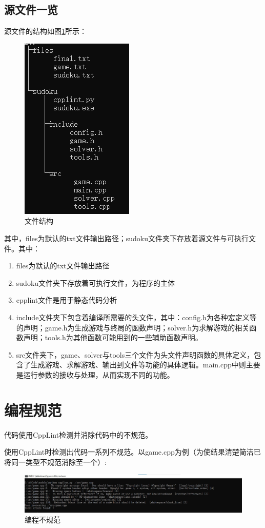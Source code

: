 \documentclass[a4paper]{article}
\begin{document}
\subsection{源文件一览}
源文件的结构如图\ref{fig:tree}所示：
\begin{figure}[!ht]
    \centering
    \includegraphics[scale=0.9]{images/tree.png}
    \caption{文件结构}
    \label{fig:tree}
\end{figure}
\par
其中，files为默认的txt文件输出路径；sudoku文件夹下存放着源文件与可执行文件。其中：
\begin{enumerate}
\item files为默认的txt文件输出路径
\item sudoku文件夹下存放着可执行文件，为程序的主体
\item cpplint文件是用于静态代码分析
\item include文件夹下包含着编译所需要的头文件，其中：config.h为各种宏定义等的声明；game.h为生成游戏与终局的函数声明；solver.h为求解游戏的相关函数声明；tools.h为其他函数可能用到的一些辅助函数声明。
\item src文件夹下，game、solver与tools三个文件为头文件声明函数的具体定义，包含了生成游戏、求解游戏、输出到文件等功能的具体逻辑。main.cpp中则主要是运行参数的接收与处理，从而实现不同的功能。

\end{enumerate}
\section{编程规范}
代码使用CppLint检测并消除代码中的不规范。

使用CppLint时检测出代码一系列不规范。以game.cpp为例（为使结果清楚简洁已将同一类型不规范消除至一个）:
\begin{figure}[!ht]
  \centering
  \includegraphics[scale=0.45]{images/ncpplint.jpg}
  \caption{编程不规范}
  \label{fig:ncpplint}
\end{figure}
\end{document}
